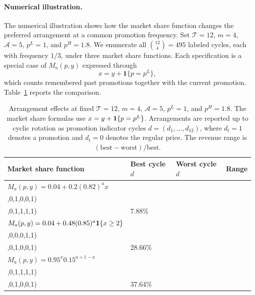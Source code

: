 \paragraph{Numerical illustration.}
The numerical illustration shows how the market share function changes the preferred arrangement at a common promotion frequency. Set \(\mathcal T=12\), \(m=4\), \(\mathcal A=5\), \(p^L=1\), and \(p^H=1.8\). We enumerate all \(\binom{12}{4}=495\) labeled cycles, each with frequency \(1/3\), under three market share functions. Each specification is a special case of \(M_a(p,y)\) expressed through
\[
    x=y+\mathbf1\{p=p^L\},
\]
which counts remembered past promotions together with the current promotion. Table~\ref{tab:fixed-tm-arrangement} reports the comparison.

\begin{table}[ht]
    \centering
    \footnotesize
    \caption{Arrangement effects at fixed \(\mathcal T=12\), \(m=4\), \(\mathcal A=5\), \(p^{L}=1\), and \(p^{H}=1.8\). The market share formulas use \(x=y+\mathbf{1}\{p=p^L\}\). Arrangements are reported up to cyclic rotation as promotion indicator cycles \(d=(d_1,\ldots,d_{12})\), where \(d_t=1\) denotes a promotion and \(d_t=0\) denotes the regular price. The revenue range is \((\text{best}-\text{worst})/\text{best}\).}
    \label{tab:fixed-tm-arrangement}
    \begin{tabularx}{\textwidth}{>{\raggedright\arraybackslash}Xllr}
        \toprule
        Market share function & Best cycle \(d\) & Worst cycle \(d\) & Range \\
        \midrule
        \(M_a(p,y)=0.04+0.2(0.82)^a x\) & \(
            \begin{array}{@{}l@{}}(0,0,1,0,0,1,\\0,0,1,0,0,1)
        \end{array}\) & \(
            \begin{array}{@{}l@{}}(0,0,0,0,0,0,\\0,0,1,1,1,1)
        \end{array}\) & 7.88\% \\
        \(M_a(p,y)=0.04+0.48(0.85)^a\mathbf{1}\{x\ge2\}\) & \(
            \begin{array}{@{}l@{}}(0,0,0,0,1,1,\\0,0,0,0,1,1)
        \end{array}\) & \(
            \begin{array}{@{}l@{}}(0,0,0,1,0,0,\\1,0,1,0,0,1)
        \end{array}\) & 28.66\% \\
        \(M_a(p,y)=0.95^x0.15^{a+1-x}\) & \(
            \begin{array}{@{}l@{}}(0,0,0,0,0,0,\\0,0,1,1,1,1)
        \end{array}\) & \(
            \begin{array}{@{}l@{}}(0,0,1,0,0,1,\\0,0,1,0,0,1)
        \end{array}\) & 37.64\% \\
        \bottomrule
    \end{tabularx}

\end{table}

